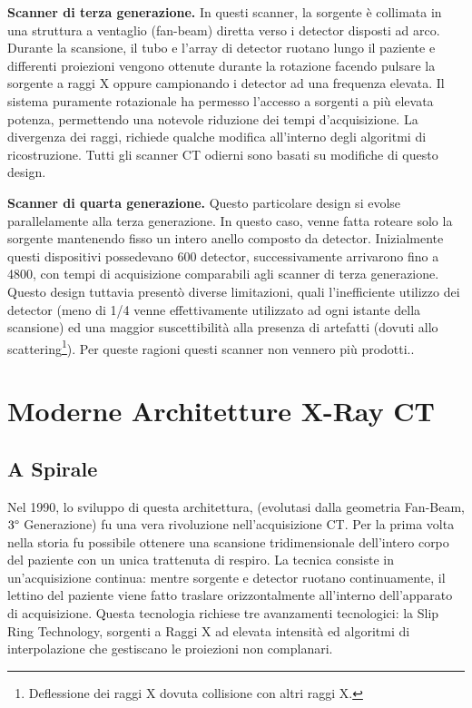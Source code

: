 \documentclass[a4paper,12pt, doubleside]{report}
\begin{document}
                \bigskip
                \par
                    \textbf{Scanner di terza generazione.} In questi scanner, la sorgente è collimata in una struttura a ventaglio (fan-beam) diretta verso i detector disposti ad arco. Durante la scansione, il tubo e l’array di detector ruotano lungo il paziente e differenti proiezioni vengono ottenute durante la rotazione facendo pulsare la sorgente a raggi X oppure campionando i detector ad una frequenza elevata. Il sistema puramente rotazionale ha permesso l’accesso a sorgenti a più elevata potenza, permettendo una notevole riduzione dei tempi d’acquisizione. La divergenza dei raggi, richiede qualche modifica all’interno degli algoritmi di ricostruzione. Tutti gli scanner CT odierni sono basati su modifiche di questo design. 
                            
                \bigskip
                \par
                    \textbf{Scanner di quarta generazione.} Questo particolare design si evolse parallelamente alla terza generazione. In questo caso, venne fatta roteare solo la sorgente mantenendo fisso un intero anello composto da detector. Inizialmente questi dispositivi possedevano 600 detector, successivamente arrivarono fino a 4800, con tempi di acquisizione comparabili agli scanner di terza generazione. Questo design tuttavia presentò diverse limitazioni, quali l’inefficiente utilizzo dei detector (meno di 1/4 venne effettivamente utilizzato ad ogni istante della scansione) ed una maggior suscettibilità alla presenza di artefatti (dovuti allo scattering\footnote{Deflessione dei raggi X dovuta collisione con altri raggi X.}). Per queste ragioni questi scanner non vennero più prodotti..
                            
        \section{Moderne Architetture X-Ray CT}
            \subsection{A Spirale}
                \par
                    Nel 1990, lo sviluppo di questa architettura, (evolutasi dalla geometria Fan-Beam, $3\degree$ Generazione) fu una vera rivoluzione nell'acquisizione CT. Per la prima volta nella storia fu possibile ottenere una scansione tridimensionale dell'intero corpo del paziente con un unica trattenuta di respiro.
                    La tecnica consiste in un'acquisizione continua: mentre sorgente e detector ruotano continuamente, il lettino del paziente viene fatto traslare orizzontalmente all'interno dell'apparato di acquisizione. Questa tecnologia richiese tre avanzamenti tecnologici: la Slip Ring Technology, sorgenti a Raggi X ad elevata intensità ed algoritmi di interpolazione che gestiscano le proiezioni non complanari.
                    
\end{document}
